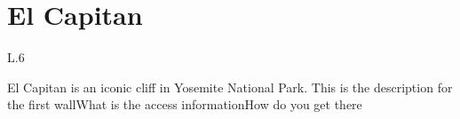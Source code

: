 \onecolumn
\chapter*{El Capitan}
\begin{wrapfigure}{L}{.6\textwidth}
\end{wrapfigure}
El Capitan is an iconic cliff in Yosemite National Park.
  {This is the description for the first wall}{}{What is the access information}{How do you get there}{}{
  }
